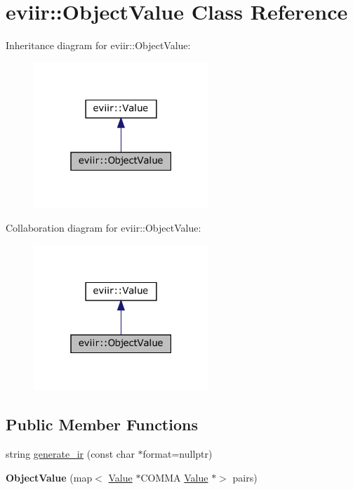 \hypertarget{classeviir_1_1ObjectValue}{}\section{eviir\+:\+:Object\+Value Class Reference}
\label{classeviir_1_1ObjectValue}


Inheritance diagram for eviir\+:\+:Object\+Value\+:\nopagebreak
\begin{figure}[H]
\begin{center}
\leavevmode
\includegraphics[width=187pt]{classeviir_1_1ObjectValue__inherit__graph}
\end{center}
\end{figure}


Collaboration diagram for eviir\+:\+:Object\+Value\+:\nopagebreak
\begin{figure}[H]
\begin{center}
\leavevmode
\includegraphics[width=187pt]{classeviir_1_1ObjectValue__coll__graph}
\end{center}
\end{figure}
\subsection*{Public Member Functions}
\begin{DoxyCompactItemize}
\item 
string \hyperlink{classeviir_1_1ObjectValue_a72adc8371c09638a785ed3823516e817}{generate\+\_\+ir} (const char $\ast$format=nullptr)
\item 
\mbox{\label{classeviir_1_1ObjectValue_a1a8c705d4f08c5f9be1650188985c79a}} 
{\bfseries Object\+Value} (map$<$ \hyperlink{classeviir_1_1Value}{Value} $\ast$C\+O\+M\+MA \hyperlink{classeviir_1_1Value}{Value} $\ast$$>$ pairs)
\end{DoxyCompactItemize}

